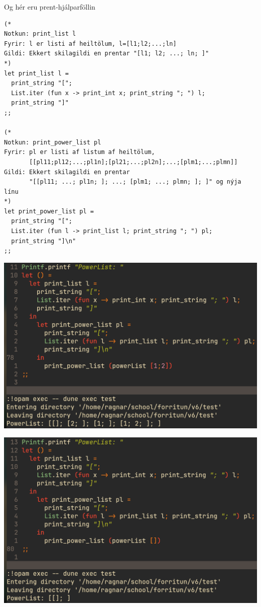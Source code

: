 \documentclass{article}
\begin{document}
	Og hér eru prent-hjálparföllin

	\begin{verbatim}
(*
Notkun: print_list l
Fyrir: l er listi af heiltölum, l=[l1;l2;...;ln]
Gildi: Ekkert skilagildi en prentar "[l1; l2; ...; ln; ]"
*)
let print_list l = 
  print_string "[";
  List.iter (fun x -> print_int x; print_string "; ") l;
  print_string "]"
;;

(*
Notkun: print_power_list pl
Fyrir: pl er listi af listum af heiltölum, 
       [[pl11;pl12;...;pl1n];[pl21;...;pl2n];...;[plm1;...;plmn]]
Gildi: Ekkert skilagildi en prentar 
       "[[pl11; ...; pl1n; ]; ...; [plm1; ...; plmn; ]; ]" og nýja línu
*)
let print_power_list pl =
  print_string "[";
  List.iter (fun l -> print_list l; print_string "; ") pl;
  print_string "]\n"
;;
	\end{verbatim}
	\begin{center}
		\includegraphics[scale=0.3]{powerlist.png}
	\end{center}
	\begin{center}
		\includegraphics[scale=0.3]{powerlist2.png}
	\end{center}
\end{document}

